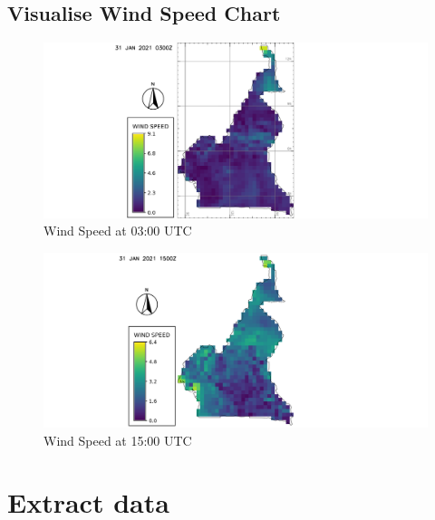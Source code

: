 \subsection{Visualise Wind Speed Chart}

\begin{figure}[H]
\begin{center}
\includegraphics[scale=0.4]{ws03.png} %
\end{center}
\caption{Wind Speed at 03:00 UTC}
\label{Wind Speed at 03:00 UTC}%
\end{figure}

\begin{figure}[H]
\begin{center}
\includegraphics[scale=0.4]{ws15.png} %
\end{center}
\caption{Wind Speed at 15:00 UTC}
\label{Wind Speed at 15:00 UTC}%
\end{figure}
\newpage
\section{Extract data}
